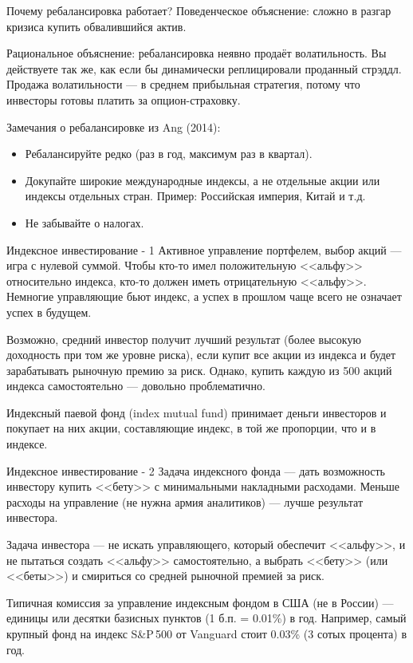 \documentclass{beamer}
\begin{document}
\begin{frame}{Почему ребалансировка работает?}
\justify
Поведенческое объяснение: сложно в разгар кризиса купить обвалившийся актив. 

Рациональное объяснение: ребалансировка неявно продаёт волатильность. Вы 
действуете так же, как если бы динамически реплицировали проданный стрэддл. 
Продажа волатильности --- в среднем прибыльная стратегия, потому что инвесторы 
готовы платить за опцион-страховку.

\justify
Замечания о ребалансировке из Ang (2014):
\begin{itemize}
\justifying
\item Ребалансируйте редко (раз в год, максимум раз в квартал).
\item Докупайте широкие международные индексы, а не отдельные акции или индексы 
отдельных стран. Пример: Российская империя, Китай и т.д.
\item Не забывайте о налогах.
\end{itemize}
\end{frame}



\begin{frame}{Индексное инвестирование - 1}
\justify
Активное управление портфелем, выбор акций --- игра с нулевой суммой. Чтобы 
кто-то имел положительную <<альфу>> относительно индекса, кто-то должен иметь 
отрицательную <<альфу>>. Немногие управляющие бьют индекс, а успех в прошлом 
чаще всего не означает успех в будущем.

\justify
Возможно, средний инвестор получит лучший результат (более высокую доходность 
при том же уровне риска), если купит все акции из индекса и будет зарабатывать 
рыночную премию за риск. Однако, купить каждую из 500 акций индекса 
самостоятельно --- довольно проблематично.

\justify
Индексный паевой фонд (index mutual fund) принимает деньги инвесторов и 
покупает на них акции, составляющие индекс, в той же пропорции, что и в 
индексе.
\end{frame}



\begin{frame}{Индексное инвестирование - 2}
\justify
Задача индексного фонда --- дать возможность инвестору купить <<бету>> с 
минимальными накладными расходами. Меньше расходы на управление (не нужна армия 
аналитиков) --- лучше результат инвестора.

\justify
Задача инвестора --- не искать управляющего, который обеспечит <<альфу>>, и не 
пытаться создать <<альфу>> самостоятельно, а выбрать <<бету>> (или <<беты>>) и 
смириться со средней рыночной премией за риск.

\justify
Типичная комиссия за управление индексным фондом в США (не в России) --- 
единицы или десятки базисных пунктов (1 б.п. = 0.01\%) в год. Например, самый 
крупный фонд на индекс S\&P\,500 от Vanguard стоит 0.03\% (3 сотых процента) в 
год.
\end{frame}
\end{document}
